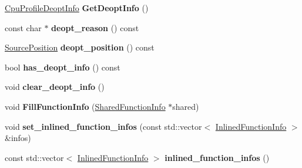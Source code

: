 \begin{DoxyCompactItemize}
\item 
\hyperlink{structv8_1_1_cpu_profile_deopt_info}{Cpu\+Profile\+Deopt\+Info} {\bfseries Get\+Deopt\+Info} ()\hypertarget{classv8_1_1internal_1_1_code_entry_a70c880a279db9b5489e978f399892a92}{}\label{classv8_1_1internal_1_1_code_entry_a70c880a279db9b5489e978f399892a92}

\item 
const char $\ast$ {\bfseries deopt\+\_\+reason} () const \hypertarget{classv8_1_1internal_1_1_code_entry_a29f3a25896b1c02b4ae9ab0718ecc9ee}{}\label{classv8_1_1internal_1_1_code_entry_a29f3a25896b1c02b4ae9ab0718ecc9ee}

\item 
\hyperlink{classv8_1_1internal_1_1_source_position}{Source\+Position} {\bfseries deopt\+\_\+position} () const \hypertarget{classv8_1_1internal_1_1_code_entry_a4b2e0d74b06a91a27927fe3cc34ece72}{}\label{classv8_1_1internal_1_1_code_entry_a4b2e0d74b06a91a27927fe3cc34ece72}

\item 
bool {\bfseries has\+\_\+deopt\+\_\+info} () const \hypertarget{classv8_1_1internal_1_1_code_entry_a6a9ad8dae8e14724bc5f46a9503e89ca}{}\label{classv8_1_1internal_1_1_code_entry_a6a9ad8dae8e14724bc5f46a9503e89ca}

\item 
void {\bfseries clear\+\_\+deopt\+\_\+info} ()\hypertarget{classv8_1_1internal_1_1_code_entry_a2fde5f4a15d06a39f3dcd51da62521de}{}\label{classv8_1_1internal_1_1_code_entry_a2fde5f4a15d06a39f3dcd51da62521de}

\item 
void {\bfseries Fill\+Function\+Info} (\hyperlink{classv8_1_1internal_1_1_shared_function_info}{Shared\+Function\+Info} $\ast$shared)\hypertarget{classv8_1_1internal_1_1_code_entry_ad344098c75b97c8c0f82f46d83b28906}{}\label{classv8_1_1internal_1_1_code_entry_ad344098c75b97c8c0f82f46d83b28906}

\item 
void {\bfseries set\+\_\+inlined\+\_\+function\+\_\+infos} (const std\+::vector$<$ \hyperlink{structv8_1_1internal_1_1_inlined_function_info}{Inlined\+Function\+Info} $>$ \&infos)\hypertarget{classv8_1_1internal_1_1_code_entry_a307fe62c835bc391985d3c10abedf0e6}{}\label{classv8_1_1internal_1_1_code_entry_a307fe62c835bc391985d3c10abedf0e6}

\item 
const std\+::vector$<$ \hyperlink{structv8_1_1internal_1_1_inlined_function_info}{Inlined\+Function\+Info} $>$ {\bfseries inlined\+\_\+function\+\_\+infos} ()\hypertarget{classv8_1_1internal_1_1_code_entry_a7ec13e3e63da03eff532661299552c80}{}\label{classv8_1_1internal_1_1_code_entry_a7ec13e3e63da03eff532661299552c80}


\end{DoxyCompactItemize}
